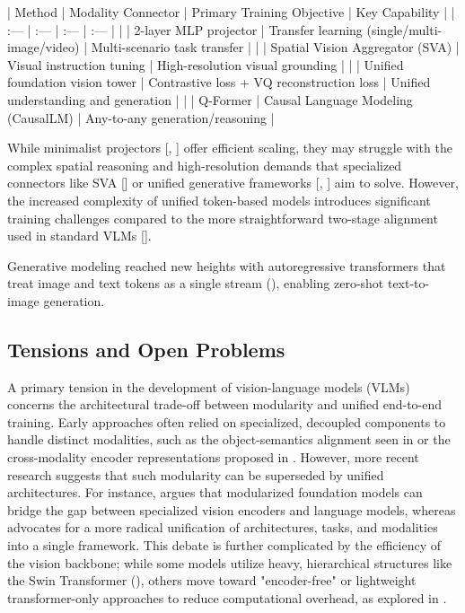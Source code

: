 \documentclass[11pt]{article}
\begin{document}
| Method | Modality Connector | Primary Training Objective | Key Capability |
| :--- | :--- | :--- | :--- |
| \citep{2408.03326} | 2-layer MLP projector | Transfer learning (single/multi-image/video) | Multi-scenario task transfer |
| \citep{2406.16860} | Spatial Vision Aggregator (SVA) | Visual instruction tuning | High-resolution visual grounding |
| \citep{2409.04429} | Unified foundation vision tower | Contrastive loss + VQ reconstruction loss | Unified understanding and generation |
| \citep{2409.17146} | Q-Former | Causal Language Modeling (CausalLM) | Any-to-any generation/reasoning |

While minimalist projectors [\citep{2408.03326}, \citep{2409.17146}] offer efficient scaling, they may struggle with the complex spatial reasoning and high-resolution demands that specialized connectors like SVA [\citep{2406.16860}] or unified generative frameworks [\citep{2409.04429}, \citep{2409.17146}] aim to solve. However, the increased complexity of unified token-based models introduces significant training challenges compared to the more straightforward two-stage alignment used in standard VLMs [\citep{2501.05952}].

Generative modeling reached new heights with autoregressive transformers that treat image and text tokens as a single stream (\citep{2102.12092}), enabling zero-shot text-to-image generation.


\subsection{Tensions and Open Problems}

A primary tension in the development of vision-language models (VLMs) concerns the architectural trade-off between modularity and unified end-to-end training. Early approaches often relied on specialized, decoupled components to handle distinct modalities, such as the object-semantics alignment seen in \citep{2004.06165} or the cross-modality encoder representations proposed in \citep{1908.07490}. However, more recent research suggests that such modularity can be superseded by unified architectures. For instance, \citep{2302.00402} argues that modularized foundation models can bridge the gap between specialized vision encoders and language models, whereas \citep{2202.03052} advocates for a more radical unification of architectures, tasks, and modalities into a single framework. This debate is further complicated by the efficiency of the vision backbone; while some models utilize heavy, hierarchical structures like the Swin Transformer (\citep{2103.14030}), others move toward "encoder-free" or lightweight transformer-only approaches to reduce computational overhead, as explored in \citep{2502.06788}.
\end{document}
